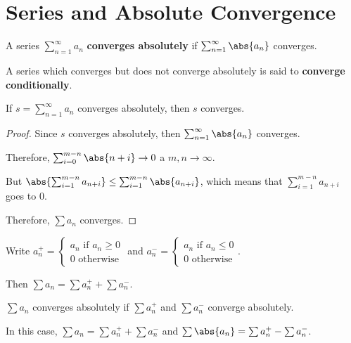 \documentclass[11pt]{scrartcl}
\begin{document}
\section{Series and Absolute Convergence}

\begin{definition}
  A series $\sum_{n=1}^{\infty}a_n$ \textbf{converges absolutely} if
  $\sum_{n=1}^{\infty}\abs{a_n}$ converges.
\end{definition}

A series which converges but does not converge absolutely is said to
\textbf{converge conditionally}.

\begin{theorem}
If $s=\sum_{n=1}^{\infty}a_n$ converges absolutely,  then $s$ converges.
\end{theorem}

\begin{proof}
  \hfill

  Since $s$ converges absolutely, then $\sum_{n=1}^{\infty} \abs{a_n}$ converges.

  Therefore, $\sum_{i=0}^{m-n} \abs{n+i} \to 0$ a $m,n \to \infty$.

  But
  $\abs{\sum_{i=1}^{m-n}a_{n+i}} \leq \sum_{i=1}^{m-n}\abs{a_{n+i}}$,
  which means that $\sum_{i=1}^{m-n}a_{n+i}$ goes to 0.

  Therefore, $\sum a_n$ converges.
\end{proof}

Write $a_n^+ = \begin{cases}
  a_n \text{ if $a_n\geq 0$}\\
  0 \text{ otherwise}
\end{cases}$ and $a_n^- = \begin{cases}
  a_n \text{ if $a_n\leq 0$}\\
  0 \text{ otherwise}
\end{cases}$.

Then $\sum a_n = \sum a_n^+ +\sum a_n^-$.

\begin{theorem}
$\sum a_n$ converges absolutely if $\sum a_n^+$ and $\sum a_n^-$ converge absolutely.

In this case, $\sum a_n = \sum a_n^+ +\sum a_n^-$ and $\sum \abs{a_n} = \sum a_n^+ -\sum a_n^-$.

\end{theorem}
\end{document}
